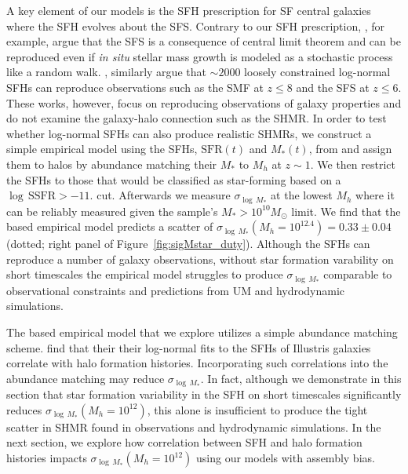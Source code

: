 \documentclass[12pt, letterpaper, preprint, tighten]{aastex62}
\newcommand{\edt}[1]{{\color{dred}{\bf} #1}}
\begin{document}
A key element of our models is the SFH prescription for SF central galaxies where 
the SFH evolves about the SFS. Contrary to our SFH prescription, \cite{kelson2014}, 
for example, argue that the SFS is a consequence of central limit theorem 
and can be reproduced even if \emph{in situ} stellar mass growth is modeled as 
a stochastic process like a random walk. \cite{gladders2013,abramson2015,abramson2016}, 
similarly argue that $\sim2000$ loosely constrained log-normal SFHs can reproduce 
observations such as the SMF at $z \leq 8$ and the SFS at $z \leq 6$. These works, 
however, focus on reproducing observations of galaxy properties and do not examine
the galaxy-halo connection such as the SHMR. In order to test whether log-normal 
SFHs can also produce realistic SHMRs, 
\edt{we construct a simple empirical model using  the SFHs, $\mathrm{SFR}(t)$ and 
$M_*(t)$, from \cite{abramson2016} and assign them to halos by abundance matching 
their $M_*$ to $M_h$ at $z{\sim}1$.} 
We then restrict the SFHs to those that would be classified as star-forming based 
on a $\log\,\mathrm{SSFR} > -11.$ cut. Afterwards we measure $\sigma_{\log\,M_*}$ 
at the lowest $M_h$ where it can be reliably measured given the \cite{abramson2016} 
sample's $M_*{>}10^{10}M_\odot$ limit. 
\edt{We find that the \cite{abramson2016} based empirical model predicts a scatter 
of $\sigma_{\log\,M_*}(M_h=10^{12.4}) = 0.33\pm0.04$ (dotted; right panel of Figure~\ref{fig:sigMstar_duty}). 
Although the \cite{abramson2016} SFHs can reproduce a number of galaxy observations, 
without star formation varability on short timescales the empirical model struggles 
to produce $\sigma_{\log\,M_*}$ comparable to observational constraints and predictions 
from UM and hydrodynamic simulations.}

\edt{The \cite{abramson2016} based empirical model that we explore utilizes a simple 
abundance matching scheme. \cite{diemer2017} find that their their log-normal fits 
to the SFHs of Illustris galaxies correlate with halo formation histories. Incorporating 
such correlations into the abundance matching may reduce $\sigma_{\log\,M_*}$. 
In fact, although we demonstrate in this section that star formation variability 
in the SFH on short timescales significantly reduces $\sigma_{\log\,M_*}(M_h=10^{12})$, 
this alone is insufficient to produce the tight scatter in SHMR found in 
observations and hydrodynamic simulations. In the next section, we explore how 
correlation between SFH and halo formation histories impacts $\sigma_{\log\,M_*}(M_h=10^{12})$ 
using our models with assembly bias. 
}
\end{document}
